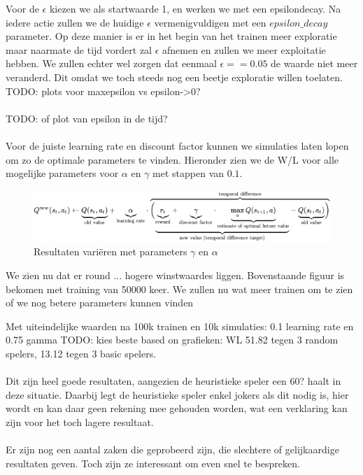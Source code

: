 \documentclass[11pt]{article}
\begin{document}
Voor de $\epsilon$ kiezen we als startwaarde 1, en werken we met een epsilondecay. Na iedere actie zullen we de huidige $\epsilon$ vermenigvuldigen met een $epsilon\_decay$ parameter. Op deze manier is er in het begin van het trainen meer exploratie maar naarmate de tijd vordert zal $\epsilon$ afnemen en zullen we meer exploitatie hebben. We zullen echter wel zorgen dat eenmaal $\epsilon == 0.05$ de waarde niet meer veranderd. Dit omdat we toch steeds nog een beetje exploratie willen toelaten.\\ 
TODO: plots voor maxepsilon vs epsilon->0?\\\\
TODO: of plot van epsilon in de tijd?\\\\

Voor de juiste learning rate en discount factor kunnen we simulaties laten lopen om zo de optimale parameters te vinden. Hieronder zien we de W/L voor alle mogelijke parameters voor $\alpha$ en $\gamma$ met stappen van $0.1$.\\

\begin{figure}[h]
\centering
\includegraphics[scale=0.70]{images/qformula.png}
\caption{Resultaten variëren met parameters $\gamma$ en $\alpha$}
\end{figure}

We zien nu dat er round ... hogere winstwaardes liggen. Bovenstaande figuur is bekomen met training van 50000 keer. We zullen nu wat meer trainen om te zien of we nog betere parameters kunnen vinden

Met uiteindelijke waarden na 100k trainen en 10k simulaties: 0.1 learning rate en 0.75 gamma TODO: kies beste based on grafieken: WL 51.82 tegen 3 random spelers, 13.12 tegen 3 basic spelers. \\\\

Dit zijn heel goede resultaten, aangezien de heuristieke speler een 60? haalt in deze situatie. Daarbij legt de heuristieke speler enkel jokers als dit nodig is, hier wordt en kan daar geen rekening mee gehouden worden, wat een verklaring kan zijn voor het toch lagere resultaat.\\\\
Er zijn nog een aantal zaken die geprobeerd zijn, die slechtere of gelijkaardige resultaten geven. Toch zijn ze interessant om even snel te bespreken.\\\\
\end{document}
